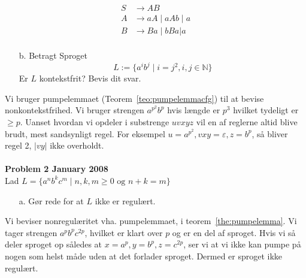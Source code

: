\begin{equation*}
\begin{split}
  S &\rightarrow AB\\
  A &\rightarrow aA \mid aAb \mid a \\
  B &\rightarrow Ba \mid bBa | a \\
\end{split}
\end{equation*}

\begin{enumerate}
  \item[b.] Betragt Sproget \[L := \{a^{i}b^{j} \mid i=j^{2}, i, j \in \mathbb{N}\}\] Er $L$ kontekstfrit? Bevis dit svar.
\end{enumerate}

Vi bruger pumpelemmaet (Teorem~\ref{teo:pumpelemmacfg}) til at bevise nonkontekstfrihed.
Vi bruger strengen $a^{p^{2}}b^{p}$ hvis længde er $p^{3}$ hvilket tydeligt er $\ge p$. Uanset hvordan vi opdeler i substrenge $uvxyz$ vil en af reglerne altid blive brudt, mest sandsynligt regel. For eksempel $u = a^{p^{2}}, vxy = \varepsilon, z = b^{p}$, så bliver regel 2, $|vy|$ ikke overholdt.
\\\\


\noindent
{\Large \textbf{Problem 2 January 2008}}\\
\noindent
Lad $L = \{a^{n}b^{k}c^{m} \mid n,k,m \ge 0 \text{ og } n+k = m\}$

\begin{enumerate}
  \item[a.] Gør rede for at $L$ ikke er regulært.
\end{enumerate}

Vi beviser nonregulæritet vha. pumpelemmaet, i teorem~\ref{the:pumpelemma}. Vi tager strengen $a^{p}b^{p}c^{2p}$, hvilket er klart over $p$ og er en del af sproget. Hvis vi så deler sproget op således at $x = a^{p}, y = b^{p}, z = c^{2p}$, ser vi at vi ikke kan pumpe på nogen som helst måde uden at det forlader sproget. Dermed er sproget ikke regulært.


